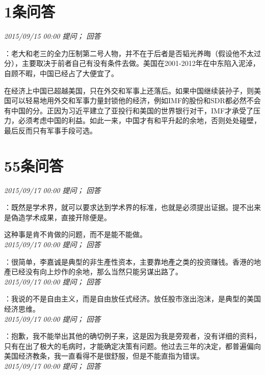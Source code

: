 \documentclass[twocolumn]{ctexart}
\begin{document}
\section{1条问答}

\textit{\hfill\noindent\small 2015/09/15 00:00 提问； 回答}

：老大和老三的全力压制第二号人物，并不在于后者是否韬光养晦（假设他不太过分），主要取决于前者自己有没有条件去做。美国在2001-2012年在中东陷入泥淖，自顾不暇，中国已经占了大便宜了。

在经济上中国已超越美国，只在外交和军事上还落后。如果中国继续装孙子，则美国可以轻易地用外交和军事力量封锁他的经济，例如IMF的股份和SDR都必然不会有中国的分。正因为习近平建立了亚投行和美国的世界银行对干，IMF才承受了压力，必须考虑中国的利益。如此一来，中国才有和平升起的余地，否则处处碰壁，最后反而只有军事手段可选。\\

\section{55条问答}

\textit{\hfill\noindent\small 2015/09/17 00:00 提问； 回答}

：既然是学术界，就可以要求达到学术界的标准，也就是必须提出证据。提不出来是偽造学术成果，直接开除便是。

这种事是肯不肯做的问题，而不是能不能做。\\

\textit{\hfill\noindent\small 2015/09/17 00:00 提问； 回答}

：很简单，李嘉诚是典型的非生產性资本，主要靠地產之类的投资赚钱。香港的地產已经没有向上炒作的余地，那么当然只能另谋出路了。\\

\textit{\hfill\noindent\small 2015/09/17 00:00 提问； 回答}

：我说的不是自由主义，而是自由放任式经济。放任股市涨出泡沫，是典型的美国经济思维。\\

\textit{\hfill\noindent\small 2015/09/17 00:00 提问； 回答}

：抱歉，我不能举出其他的确切例子来，这是因为我是旁观者，没有详细的资料，只有在出了极大的毛病时，才能确定决策有问题。他过去三年的决定，都普遍偏向美国经济教条，我一直看得不是很舒服，但是不能直指为错误。\\

\textit{\hfill\noindent\small 2015/09/17 00:00 提问； 回答}
\end{document}

